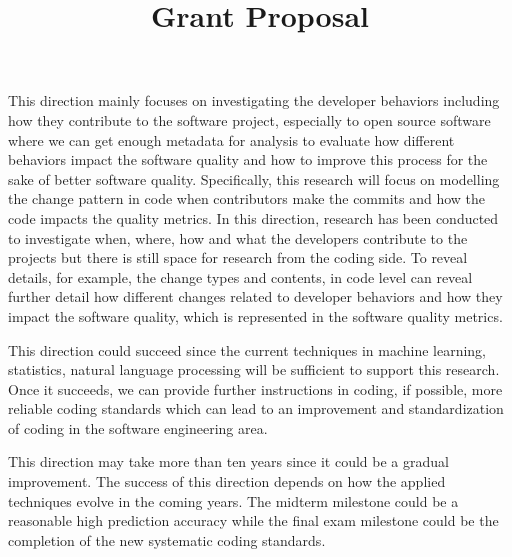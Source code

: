 \documentclass[10pt,conference]{IEEEtran}
\begin{document}
\title{Grant Proposal}

\author{
}

\maketitle


This direction mainly focuses on investigating the developer behaviors including how they contribute to the software project, especially to open source software where we can get enough metadata for analysis to evaluate how different behaviors impact the software quality and how to improve this process for the sake of better software quality. Specifically, this research will focus on modelling the change pattern in code when contributors make the commits and how the code impacts the quality metrics. In this direction, research has been conducted to investigate when, where, how and what the developers contribute to the projects but there is still space for research from the coding side. To reveal details, for example, the change types and contents, in code level can reveal further detail how different changes related to developer behaviors and how they impact the software quality, which is represented in the software quality metrics.

This direction could succeed since the current techniques in machine learning, statistics, natural language processing will be sufficient to support this research. Once it succeeds, we can provide further instructions in coding, if possible, more reliable coding standards which can lead to an improvement and standardization of coding in the software engineering area.

This direction may take more than ten years since it could be a gradual improvement. The success of this direction depends on how the applied techniques evolve in the coming years. The midterm milestone could be a reasonable high prediction accuracy while the final exam milestone could be the completion of the new systematic coding standards.
\end{document}
